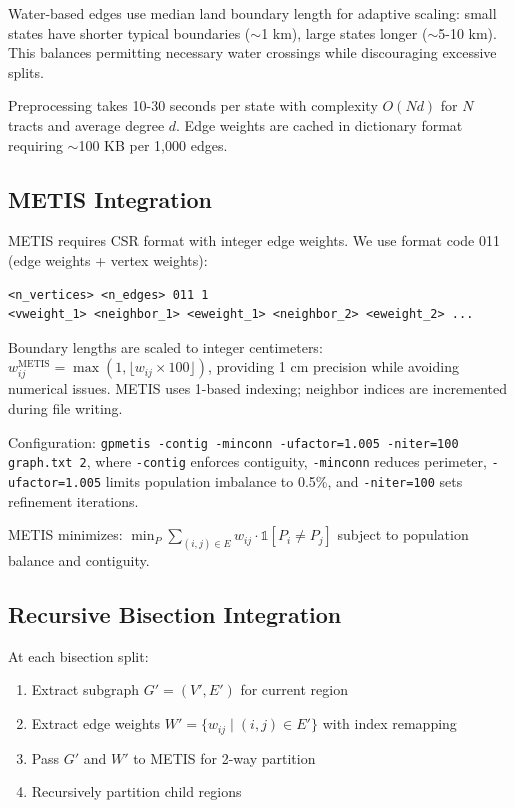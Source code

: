 \documentclass[11pt,twocolumn]{article}
\begin{document}
Water-based edges use median land boundary length for adaptive scaling: small states have shorter typical boundaries ($\sim$1 km), large states longer ($\sim$5-10 km). This balances permitting necessary water crossings while discouraging excessive splits.

Preprocessing takes 10-30 seconds per state with complexity $O(Nd)$ for $N$ tracts and average degree $d$. Edge weights are cached in dictionary format requiring $\sim$100 KB per 1,000 edges.

\subsection{METIS Integration}

METIS requires CSR format with integer edge weights. We use format code 011 (edge weights + vertex weights):

\begin{verbatim}
<n_vertices> <n_edges> 011 1
<vweight_1> <neighbor_1> <eweight_1> <neighbor_2> <eweight_2> ...
\end{verbatim}

Boundary lengths are scaled to integer centimeters: $w_{ij}^{\text{METIS}} = \max(1, \lfloor w_{ij} \times 100 \rfloor)$, providing 1 cm precision while avoiding numerical issues. METIS uses 1-based indexing; neighbor indices are incremented during file writing.

Configuration: \texttt{gpmetis -contig -minconn -ufactor=1.005 -niter=100 graph.txt 2}, where \texttt{-contig} enforces contiguity, \texttt{-minconn} reduces perimeter, \texttt{-ufactor=1.005} limits population imbalance to 0.5\%, and \texttt{-niter=100} sets refinement iterations.

METIS minimizes: $\min_{P} \sum_{(i,j) \in E} w_{ij} \cdot \mathbb{1}[P_i \neq P_j]$ subject to population balance and contiguity.

\subsection{Recursive Bisection Integration}

At each bisection split:
\begin{enumerate}
\item Extract subgraph $G' = (V', E')$ for current region
\item Extract edge weights $W' = \{w_{ij} \mid (i,j) \in E'\}$ with index remapping
\item Pass $G'$ and $W'$ to METIS for 2-way partition
\item Recursively partition child regions
\end{enumerate}
\end{document}
